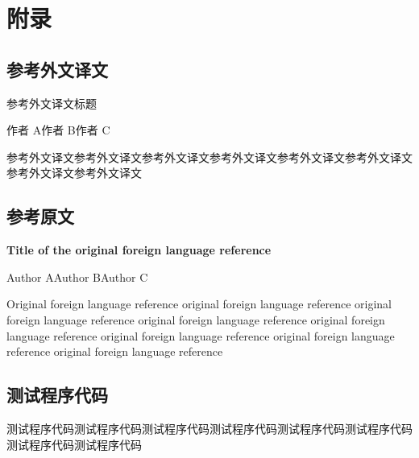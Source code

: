 \appendix
\renewcommand{\thesubsection}{\Alph{subsection}} %
\section*{\heiti{}附\qquad 录}

\subsection{参考外文译文}

\begin{center}
{\heiti 参考外文译文标题}
\end{center}
\begin{center}
作者 A\qquad 作者 B\qquad 作者 C
\end{center}

参考外文译文参考外文译文参考外文译文参考外文译文参考外文译文参考外文译文参考外文译文参考外文译文

\subsection{参考原文}

\begin{center}
\textbf{Title of the original foreign language reference}
\end{center}
\begin{center}
Author A\qquad Author B\qquad Author C
\end{center}

Original foreign language reference original foreign language reference original foreign language reference original foreign language reference original foreign language reference original foreign language reference original foreign language reference original foreign language reference

\subsection{测试程序代码}

测试程序代码测试程序代码测试程序代码测试程序代码测试程序代码测试程序代码测试程序代码测试程序代码
